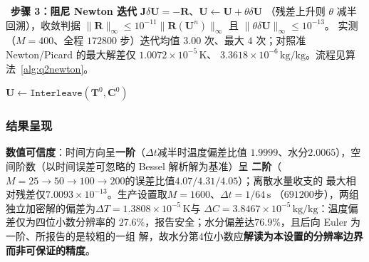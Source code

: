 \documentclass[withoutpreface,bwprint]{cumcmthesis} %
\begin{document}
\noindent{}\ \textbf{步骤 3：阻尼 Newton 迭代}
$\mathbf{J}\delta\mathbf{U}=-\mathbf{R}$、$\mathbf{U}\leftarrow\mathbf{U}+\theta\delta\mathbf{U}$
（残差上升则 $\theta$ 减半回溯），收敛判据 $\|\mathbf{R}\|_\infty\le10^{-11}
\|\mathbf{R}(\mathbf{U}^{n})\|_\infty$ 且 $\|\theta\delta\mathbf{U}\|_\infty\le10^{-13}$。
实测（$M=400$、全程 $172800$ 步）迭代均值 $3.00$ 次、最大 $4$ 次；对照准
Newton/Picard 的最大解差仅 $1.0072\times10^{-5}\,\mathrm{K}$、
$3.3618\times10^{-6}\,\mathrm{kg/kg}$。流程见算法~\ref{alg:q2newton}。

\begin{algorithm}[htbp]
\small
\caption{问题二：非线性方程组的时间推进与阻尼 Newton 求解}
\label{alg:q2newton}
$\mathbf{U}\leftarrow\texttt{Interleave}(\mathbf{T}^{0},\mathbf{C}^{0})$
\end{algorithm}

\subsubsection{结果呈现}
\label{sec:q2results}

\textbf{数值可信度}：时间方向呈\textbf{一阶}（$\Delta t$减半时温度偏差比值
$1.9999$、水分$2.0065$），空间阶数（以时间误差可忽略的 Bessel 解析解为基准）呈
\textbf{二阶}（$M=25\to50\to100\to200$的误差比值$4.07/4.31/4.05$）；离散水量收支的
最大相对残差仅$7.0093\times10^{-13}$。生产设置取$M=1600$、$\Delta t=1/64\,\mathrm{s}$
（$691200$步），两组独立加密解的偏差为$\Delta T=1.3808\times10^{-5}\,\mathrm{K}$与
$\Delta C=3.8467\times10^{-5}\,\mathrm{kg/kg}$：温度偏差仅为四位小数分辨率的
$27.6\%$，报告安全；水分偏差达$76.9\%$，且后向 Euler 为一阶、所报告的是较粗的一组
解，故水分第$4$位小数应\textbf{解读为本设置的分辨率边界而非可保证的精度}。
\end{document}
